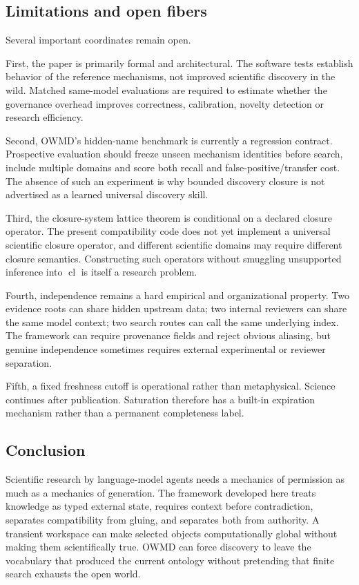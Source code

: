 \documentclass[11pt]{article}
\newcommand{\cl}{\operatorname{cl}}
\begin{document}
\subsection{Limitations and open fibers}

Several important coordinates remain open.

First, the paper is primarily formal and architectural. The software tests establish behavior of the reference mechanisms, not improved scientific discovery in the wild. Matched same-model evaluations are required to estimate whether the governance overhead improves correctness, calibration, novelty detection or research efficiency.

Second, OWMD's hidden-name benchmark is currently a regression contract. Prospective evaluation should freeze unseen mechanism identities before search, include multiple domains and score both recall and false-positive/transfer cost. The absence of such an experiment is why bounded discovery closure is not advertised as a learned universal discovery skill.

Third, the closure-system lattice theorem is conditional on a declared closure operator. The present compatibility code does not yet implement a universal scientific closure operator, and different scientific domains may require different closure semantics. Constructing such operators without smuggling unsupported inference into \(\cl\) is itself a research problem.

Fourth, independence remains a hard empirical and organizational property. Two evidence roots can share hidden upstream data; two internal reviewers can share the same model context; two search routes can call the same underlying index. The framework can require provenance fields and reject obvious aliasing, but genuine independence sometimes requires external experimental or reviewer separation.

Fifth, a fixed freshness cutoff is operational rather than metaphysical. Science continues after publication. Saturation therefore has a built-in expiration mechanism rather than a permanent completeness label.

\subsection{Conclusion}

Scientific research by language-model agents needs a mechanics of permission as much as a mechanics of generation. The framework developed here treats knowledge as typed external state, requires context before contradiction, separates compatibility from gluing, and separates both from authority. A transient workspace can make selected objects computationally global without making them scientifically true. OWMD can force discovery to leave the vocabulary that produced the current ontology without pretending that finite search exhausts the open world.
\end{document}
